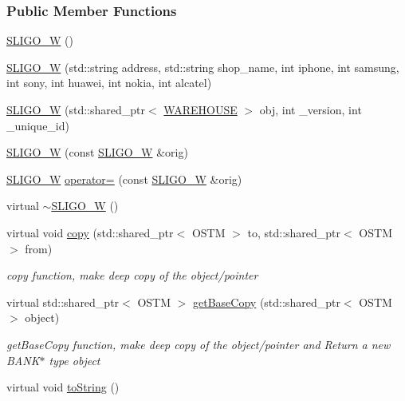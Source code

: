 \subsubsection*{Public Member Functions}
\begin{DoxyCompactItemize}
\item 
\hyperlink{class_s_l_i_g_o___w_a9b669809dc7cf8d9982181ac7997b0da}{S\+L\+I\+G\+O\+\_\+W} ()
\item 
\hyperlink{class_s_l_i_g_o___w_aced291d99970ff1c2f2146256f400788}{S\+L\+I\+G\+O\+\_\+W} (std\+::string address, std\+::string shop\+\_\+name, int iphone, int samsung, int sony, int huawei, int nokia, int alcatel)
\item 
\hyperlink{class_s_l_i_g_o___w_a5a969bbfbb08f8a5d29f766288f2f7e6}{S\+L\+I\+G\+O\+\_\+W} (std\+::shared\+\_\+ptr$<$ \hyperlink{class_w_a_r_e_h_o_u_s_e}{W\+A\+R\+E\+H\+O\+U\+SE} $>$ obj, int \+\_\+version, int \+\_\+unique\+\_\+id)
\item 
\hyperlink{class_s_l_i_g_o___w_abd92acb0451fe449fbdb7c3c2a6701b7}{S\+L\+I\+G\+O\+\_\+W} (const \hyperlink{class_s_l_i_g_o___w}{S\+L\+I\+G\+O\+\_\+W} \&orig)
\item 
\hyperlink{class_s_l_i_g_o___w}{S\+L\+I\+G\+O\+\_\+W} \hyperlink{class_s_l_i_g_o___w_a64051fdd5b3ebc47b0a74b42eb092c1b}{operator=} (const \hyperlink{class_s_l_i_g_o___w}{S\+L\+I\+G\+O\+\_\+W} \&orig)
\item 
virtual \hyperlink{class_s_l_i_g_o___w_aa6cc833af07309dee5eb2493cddf443c}{$\sim$\+S\+L\+I\+G\+O\+\_\+W} ()
\item 
virtual void \hyperlink{class_s_l_i_g_o___w_acd5ae7347e6ca94c52eb013e07a66116}{copy} (std\+::shared\+\_\+ptr$<$ O\+S\+TM $>$ to, std\+::shared\+\_\+ptr$<$ O\+S\+TM $>$ from)
\begin{DoxyCompactList}\small\item\em copy function, make deep copy of the object/pointer \end{DoxyCompactList}\item 
virtual std\+::shared\+\_\+ptr$<$ O\+S\+TM $>$ \hyperlink{class_s_l_i_g_o___w_a37ead49afd27bfe7e404d1d7626f09fe}{get\+Base\+Copy} (std\+::shared\+\_\+ptr$<$ O\+S\+TM $>$ object)
\begin{DoxyCompactList}\small\item\em get\+Base\+Copy function, make deep copy of the object/pointer and Return a new B\+A\+N\+K$\ast$ type object \end{DoxyCompactList}\item 
virtual void \hyperlink{class_s_l_i_g_o___w_a8f49deaa85f48ff29dd8cdeb7c9dda56}{to\+String} ()

\end{DoxyCompactItemize}
